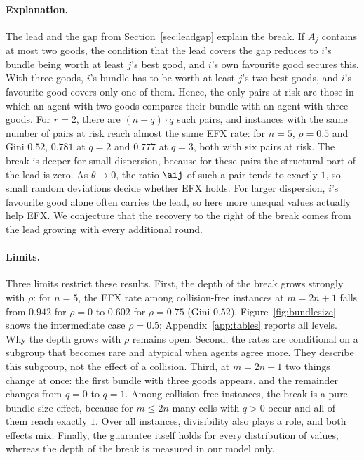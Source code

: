\paragraph{Explanation.}
The lead and the gap from Section~\ref{sec:leadgap} explain the break. If $A_j$ contains at most two goods, the condition that the lead covers the gap reduces to $i$'s bundle being worth at least $j$'s best good, and $i$'s own favourite good secures this. With three goods, $i$'s bundle has to be worth at least $j$'s two best goods, and $i$'s favourite good covers only one of them. Hence, the only pairs at risk are those in which an agent with two goods compares their bundle with an agent with three goods. For $r=2$, there are $(n-q)\cdot q$ such pairs, and instances with the same number of pairs at risk reach almost the same EFX rate: for $n=5$, $\rho=0.5$ and Gini $0.52$, $0.781$ at $q=2$ and $0.777$ at $q=3$, both with six pairs at risk. The break is deeper for small dispersion, because for these pairs the structural part of the lead is zero. As $\theta\to0$, the ratio $\aij$ of such a pair tends to exactly $1$, so small random deviations decide whether EFX holds. For larger dispersion, $i$'s favourite good alone often carries the lead, so here more unequal values actually help EFX. We conjecture that the recovery to the right of the break comes from the lead growing with every additional round.

\paragraph{Limits.}
Three limits restrict these results. First, the depth of the break grows strongly with $\rho$: for $n=5$, the EFX rate among collision-free instances at $m=2n+1$ falls from $0.942$ for $\rho=0$ to $0.602$ for $\rho=0.75$ (Gini $0.52$). Figure~\ref{fig:bundlesize} shows the intermediate case $\rho=0.5$; Appendix~\ref{app:tables} reports all levels. Why the depth grows with $\rho$ remains open. Second, the rates are conditional on a subgroup that becomes rare and atypical when agents agree more. They describe this subgroup, not the effect of a collision. Third, at $m=2n+1$ two things change at once: the first bundle with three goods appears, and the remainder changes from $q=0$ to $q=1$. Among collision-free instances, the break is a pure bundle size effect, because for $m\leq2n$ many cells with $q>0$ occur and all of them reach exactly $1$. Over all instances, divisibility also plays a role, and both effects mix. Finally, the guarantee itself holds for every distribution of values, whereas the depth of the break is measured in our model only.

